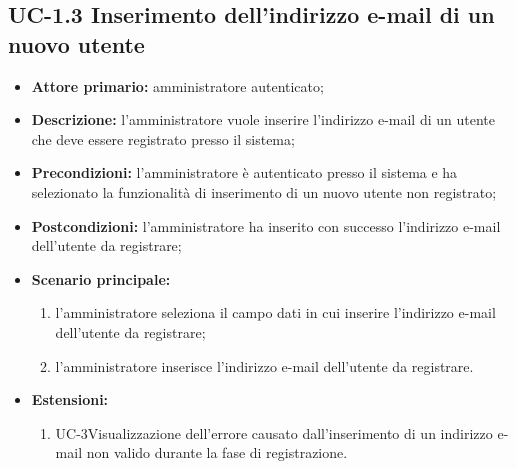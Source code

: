 \subsection{UC-1.3 Inserimento dell'indirizzo e-mail di un nuovo utente}
\begin{itemize}
	\item \textbf{Attore primario:} amministratore autenticato;

	\item \textbf{Descrizione:} l'amministratore vuole inserire l'indirizzo e-mail di un utente che deve essere registrato presso il sistema;

	\item \textbf{Precondizioni:} l'amministratore è autenticato presso il sistema e ha selezionato la funzionalità di inserimento di un nuovo utente non registrato;

	\item \textbf{Postcondizioni:} l'amministratore ha inserito con successo l'indirizzo e-mail dell'utente da registrare;

	\item \textbf{Scenario principale:}
		\begin{enumerate}
   		 	\item l'amministratore seleziona il campo dati in cui inserire l'indirizzo e-mail dell'utente da registrare;
    		\item l'amministratore inserisce l'indirizzo e-mail dell'utente da registrare.
		\end{enumerate}
	
	\item \textbf{Estensioni:}
		\begin{enumerate}
    		\item UC-3Visualizzazione dell'errore causato dall'inserimento di un indirizzo e-mail non valido durante la fase di registrazione.
		\end{enumerate}
\end{itemize}
